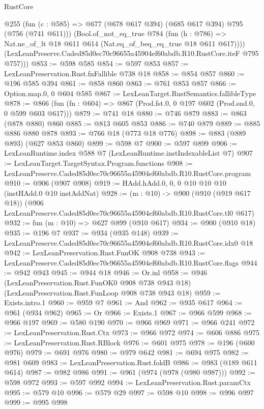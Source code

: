 \begin{lexlean}{RustCore}
\begin{coremodule}
          @255
          (fun (c : @585) => @677 (@678 @617 @394) (@685 @617 @394) @795 (@756 (@741 @611)))
          (Bool.of_not_eq_true
            @784
            (fun (h : @786) => Nat.ne_of_lt @18 @611 @614 (Nat.eq_of_beq_eq_true @18 @611 @617))))
        (LexLeanPreserve.Caded85d0ec70c96655a45904ef60abdb.R10.RustCore.iteF @795 @757)))
@853 := @598 @585
@854 := @597 @853
@857 := LexLeanPreservation.Rust.fnFallible @738 @18
@858 := @854 @857
@860 := @196 @585 @394
@861 := @858 @860
@863 := @761 @853 @857
@866 := Option.map.{0, 0} @604 @585
@867 := LexLeanTarget.RustSemantics.fallibleType
@878 := @866 (fun (fn : @604) => @867 (Prod.fst.{0, 0} @197 @602 (Prod.snd.{0, 0} @599 @603 @617)))
@879 := @741 @18
@880 := @746 @879
@883 := @863 (@878 @880) @860
@885 := @813 @605 @853
@886 := @740 @879
@889 := @885 @886 @880 @878
@893 := @766 @18 (@773 @18 @776)
@898 := @883 (@889 @893) (@627 @853 @860)
@899 := @598 @7
@900 := @597 @899
@906 := LexLeanRuntime.index @588 @7 (LexLeanRuntime.instIndexableList @7)
@907 := LexLeanTarget.TargetSyntax.Program.functions
@908 := LexLeanPreserve.Caded85d0ec70c96655a45904ef60abdb.R10.RustCore.program
@910 := @906 (@907 @908)
@919 := HAdd.hAdd.{0, 0, 0} @10 @10 @10 (instHAdd.{0} @10 instAddNat)
@928 := (m : @10) ->
  @900
    (@910 (@919 @617 @18))
    (@906 LexLeanPreserve.Caded85d0ec70c96655a45904ef60abdb.R10.RustCore.tl0 @617)
@932 := fun (m : @10) => @627 @899 (@910 @617)
@934 := @900 (@910 @18)
@935 := @196 @7
@937 := @934 (@935 @148)
@939 := LexLeanPreserve.Caded85d0ec70c96655a45904ef60abdb.R10.RustCore.idx0 @18
@942 := LexLeanPreservation.Rust.FunOK @908 @738
@943 := LexLeanPreserve.Caded85d0ec70c96655a45904ef60abdb.R10.RustCore.flags
@944 := @942 @943
@945 := @944 @18
@946 := Or.inl
@958 := @946
    (LexLeanPreservation.Rust.FunOK0 @908 @738 @943 @18)
    (LexLeanPreservation.Rust.FunLoop @908 @738 @943 @18)
@959 := Exists.intro.{1}
@960 := @959 @7
@961 := And
@962 := @935 @617
@964 := @961 (@934 @962)
@965 := Or
@966 := Exists.{1}
@967 := @966 @599
@968 := @966 @197
@969 := @580 @190
@970 := @966 @969
@971 := @966 @241
@972 := LexLeanPreservation.Rust.Ctx
@973 := @966 @972
@974 := @606 @886
@975 := LexLeanPreservation.Rust.RBlock
@976 := @601 @975
@978 := @196 (@600 @976)
@979 := @691 @976
@980 := @979 @642
@981 := @694 @975
@982 := @981 @609
@983 := LexLeanPreservation.Rust.foldB
@986 := @983 (@189 @611 @614)
@987 := @982 @986
@991 := @961 (@974 (@978 (@980 @987)))
@992 := @598 @972
@993 := @597 @992
@994 := LexLeanPreservation.Rust.paramCtx
@995 := @579 @10
@996 := @579 @29
@997 := @598 @10
@998 := @996 @997
@999 := @995 @998

\end{coremodule}
\end{lexlean}
